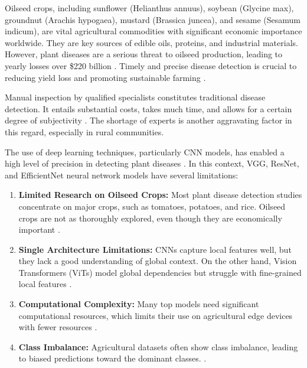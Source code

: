 \documentclass[default, iicol]{sn-jnl}
\theoremstyle{thmstyleone}%
\theoremstyle{thmstyletwo}%
\theoremstyle{thmstylethree}%
\begin{document}
Oilseed crops, including sunflower (Helianthus annuus), soybean (Glycine max), groundnut (Arachis hypogaea), mustard (Brassica juncea), and sesame (Sesamum indicum), are vital agricultural commodities with significant economic importance worldwide. They are key sources of edible oils, proteins, and industrial materials. However, plant diseases are a serious threat to oilseed production, leading to yearly losses over \$220 billion \cite{shafay2025recent}. Timely and precise disease detection is crucial to reducing yield loss and promoting sustainable farming \cite{zainab2025plant}.

Manual inspection by qualified specialists constitutes traditional disease detection. It entails substantial costs, takes much time, and allows for a certain degree of subjectivity \cite{bouacida2025innovative}. The shortage of experts is another aggravating factor in this regard, especially in rural communities.

The use of deep learning techniques, particularly CNN models, has enabled a high level of precision in detecting plant diseases \cite{mohanty2016using,shaheed2023efficientrmtnet}\cite{mohanty2016using}. In this context, VGG, ResNet, and EfficientNet neural network models have several limitations: 

\begin{enumerate}
\item \textbf{Limited Research on Oilseed Crops:} Most plant disease detection studies concentrate on major crops, such as tomatoes, potatoes, and rice. Oilseed crops are not as thoroughly explored, even though they are economically important \cite{sara2022sunflower}.

\item \textbf{Single Architecture Limitations:} CNNs capture local features well, but they lack a good understanding of global context. On the other hand, Vision Transformers (ViTs) model global dependencies but struggle with fine-grained local features \cite{li2023pmvt,khan2023hybrid}.

\item \textbf{Computational Complexity:} Many top models need significant computational resources, which limits their use on agricultural edge devices with fewer resources \cite{huang2023knowledge}.

\item \textbf{Class Imbalance:} Agricultural datasets often show class imbalance, leading to biased predictions toward the dominant classes.
\cite{gnanasekaran2020cassava}.
\end{enumerate}
\end{document}
